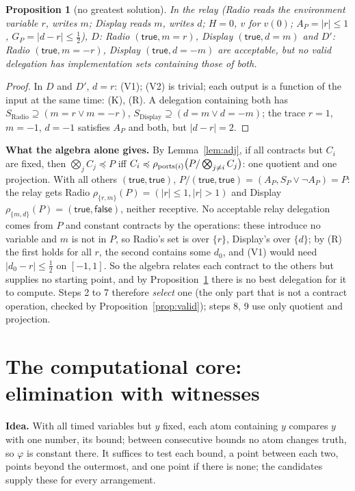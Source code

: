 \documentclass[10pt]{article}
\theoremstyle{tplain}\newtheorem{theorem}{Theorem}\newtheorem{lemma}[theorem]{Lemma}\newtheorem{proposition}[theorem]{Proposition}\newtheorem{corollary}[theorem]{Corollary}
\theoremstyle{tdef}\newtheorem{definition}[theorem]{Definition}
\newcommand{\TRUE}{\mathsf{true}}\newcommand{\FALSE}{\mathsf{false}}
\begin{document}
\begin{proposition}[no greatest solution]\label{prop:nogreatest}
In the \emph{relay} (Radio reads the environment variable $r$, writes $m$; Display reads $m$, writes $d$; $H=0$, $v$ for $v(0)$; $A_P=|r|\le1$, $G_P=|d-r|\le\frac12$), $D$: Radio $(\TRUE,m=r)$, Display $(\TRUE,d=m)$ and $D'$: Radio $(\TRUE,m=-r)$, Display $(\TRUE,d=-m)$ are acceptable, but no valid delegation has implementation sets containing those of both.
\end{proposition}
\begin{proof}
In $D$ and $D'$, $d=r$: (V1); (V2) is trivial; each output is a function of the input at the same time: (K), (R). A delegation containing both has $S_{\mathrm{Radio}}\supseteq(m=r\vee m=-r)$, $S_{\mathrm{Display}}\supseteq(d=m\vee d=-m)$; the trace $r=1$, $m=-1$, $d=-1$ satisfies $A_P$ and both, but $|d-r|=2$.
\end{proof}
\textbf{What the algebra alone gives.} By Lemma~\ref{lem:adj}, if all contracts but $C_i$ are fixed, then $\bigotimes_jC_j\preccurlyeq P$ iff $C_i\preccurlyeq\rho_{\mathrm{ports}(i)}\big(P/\bigotimes_{j\ne i}C_j\big)$: one quotient and one projection. With all others $(\TRUE,\TRUE)$, $P/(\TRUE,\TRUE)=(A_P,S_P\vee\neg A_P)=P$: the relay gets Radio $\rho_{\{r,m\}}(P)=(|r|\le1,|r|>1)$ and Display $\rho_{\{m,d\}}(P)=(\TRUE,\FALSE)$, neither receptive. No acceptable relay delegation comes from $P$ and constant contracts by the operations: these introduce no variable and $m$ is not in $P$, so Radio's set is over $\{r\}$, Display's over $\{d\}$; by (R) the first holds for all $r$, the second contains some $d_0$, and (V1) would need $|d_0-r|\le\frac12$ on $[-1,1]$. So the algebra relates each contract to the others but supplies no starting point, and by Proposition~\ref{prop:nogreatest} there is no best delegation for it to compute. Steps 2 to 7 therefore \emph{select} one (the only part that is not a contract operation, checked by Proposition~\ref{prop:valid}); steps 8, 9 use only quotient and projection.

\section{The computational core: elimination with witnesses}\label{sec:qe}
\textbf{Idea.} With all timed variables but $y$ fixed, each atom containing $y$ compares $y$ with one number, its bound; between consecutive bounds no atom changes truth, so $\varphi$ is constant there. It suffices to test each bound, a point between each two, points beyond the outermost, and one point if there is none; the candidates supply these for every arrangement.
\end{document}
